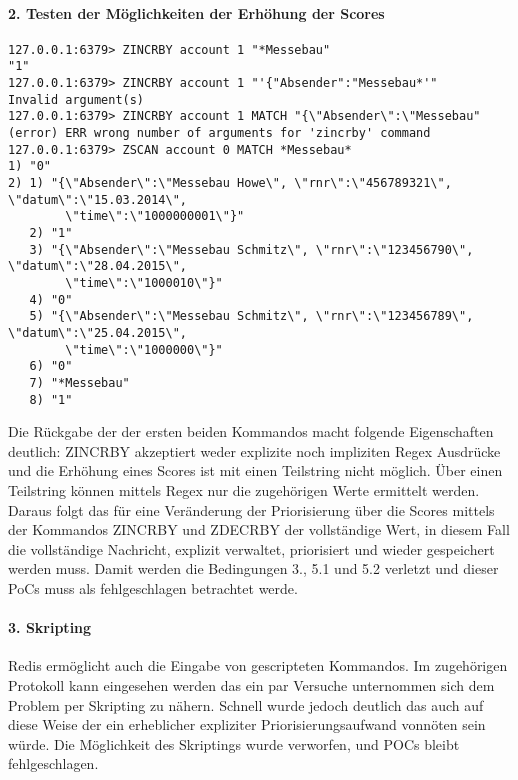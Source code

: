 \documentclass[11pt,oneside,a4paper,notitlepage]{article}
\begin{document}
%
\paragraph*{2. Testen der Möglichkeiten der Erhöhung der Scores}
\begin{verbatim}
127.0.0.1:6379> ZINCRBY account 1 "*Messebau"
"1"
127.0.0.1:6379> ZINCRBY account 1 "'{"Absender":"Messebau*'"
Invalid argument(s)
127.0.0.1:6379> ZINCRBY account 1 MATCH "{\"Absender\":\"Messebau"
(error) ERR wrong number of arguments for 'zincrby' command
127.0.0.1:6379> ZSCAN account 0 MATCH *Messebau*
1) "0"
2) 1) "{\"Absender\":\"Messebau Howe\", \"rnr\":\"456789321\", \"datum\":\"15.03.2014\", 
		\"time\":\"1000000001\"}"
   2) "1"
   3) "{\"Absender\":\"Messebau Schmitz\", \"rnr\":\"123456790\", \"datum\":\"28.04.2015\", 
   		\"time\":\"1000010\"}"
   4) "0"
   5) "{\"Absender\":\"Messebau Schmitz\", \"rnr\":\"123456789\", \"datum\":\"25.04.2015\", 
   		\"time\":\"1000000\"}"
   6) "0"
   7) "*Messebau"
   8) "1"
\end{verbatim}
Die Rückgabe der der ersten beiden Kommandos macht folgende Eigenschaften deutlich: ZINCRBY akzeptiert weder explizite noch impliziten Regex Ausdrücke und die Erhöhung eines Scores ist mit einen Teilstring nicht möglich. Über einen Teilstring können mittels Regex nur die zugehörigen Werte ermittelt werden. Daraus folgt das für eine Veränderung der Priorisierung über die Scores mittels der Kommandos ZINCRBY und ZDECRBY der vollständige Wert, in diesem Fall die vollständige Nachricht, explizit verwaltet, priorisiert und wieder gespeichert werden muss. Damit werden die Bedingungen 3., 5.1 und 5.2 verletzt und dieser PoCs muss als fehlgeschlagen betrachtet werde.

\paragraph*{3. Skripting}
Redis ermöglicht auch die Eingabe von gescripteten Kommandos. Im zugehörigen Protokoll kann eingesehen werden das ein par Versuche unternommen sich dem Problem per Skripting zu nähern. Schnell wurde jedoch deutlich das auch auf diese Weise der ein erheblicher expliziter Priorisierungsaufwand vonnöten sein würde. Die Möglichkeit des Skriptings wurde verworfen, und POCs bleibt fehlgeschlagen.
\end{document}
